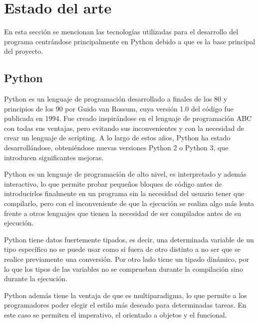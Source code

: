 \documentclass[a4paper, 12pt]{book}
\begin{document}

\cleardoublepage
\chapter{Estado del arte}
En esta sección se mencionan las tecnologías utilizadas para el desarrollo del programa centrándose principalmente en Python debido a que es la base principal del proyecto.



\section{Python} 
\label{sec:seccion1}

Python es un lenguaje de programación desarrollado a finales de los 80 y principios de los 90 por Guido van Rossum, cuya versión 1.0 del código fue publicada en 1994. Fue creado inspirándose en el lenguaje de programación ABC con todas sus ventajas, pero evitando sus inconvenientes y con la necesidad de crear un lenguaje de scripting. A lo largo de estos años, Python ha estado desarrollándose, obteniéndose nuevas versiones Python 2 o Python 3, que introducen significantes mejoras. 

Python es un lenguaje de programación de alto nivel, es interpretado y además interactivo, lo que permite probar pequeños bloques de código antes de introducirlos finalmente en un programa sin la necesidad del usuario tener que compilarlo, pero con el inconveniente de que la ejecución se realiza algo más lenta frente a otros lenguajes que tienen la necesidad de ser compilados antes de su ejecución.

Python tiene datos fuertemente tipados, es decir, una determinada variable de un tipo específico no se puede usar como si fuera de otro distinto a no ser que se realice previamente una conversión. Por otro lado tiene un tipado dinámico, por lo que los tipos de las variables no se comprueban durante la compilación sino durante la ejecución.

Python además tiene la ventaja de que es multiparadigma, lo que permite a los programadores poder elegir el estilo más deseado para determinadas tareas. En este caso se permiten el imperativo, el orientado a objetos y el funcional.
\end{document}
